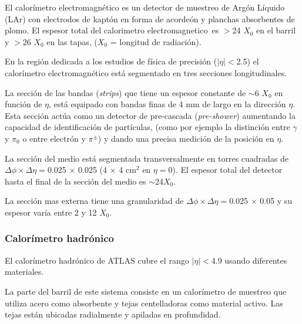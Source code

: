 El calorímetro electromagnético es un detector de muestreo de Argón Líquido (LAr)
con electrodos de kaptón en forma de acordeón y planchas absorbentes de plomo.
El espesor total del calorimetro electromagnetico\ es $>$24 $X_0$ en el barril
y $>$26 $X_0$ en las tapas, ($X_0$ = longitud de radiación).

En la región dedicada a los estudios de física de precisión ($|\eta|<$2.5) el
calorímetro electromagnético está segmentado en tres secciones longitudinales.%



La sección de las bandas (\emph{strips}) que tiene un espesor constante de $\sim$6 $X_0$ en función de $\eta$, está equipado con bandas finas de 4 mm de largo en la dirección $\eta$.
Esta sección actúa como un detector de pre-cascada (\emph{pre-shower}) aumentando la capacidad de identificación de partículas, (como por ejemplo la distinción entre $\gamma$ y $\pi_0$ o entre electrón y $\pi^\pm$) y dando una precisa medición de la posición en $\eta$.

La sección del medio está segmentada transversalmente en torres cuadradas de $\Delta \phi \times \Delta \eta=$0.025 $\times$ 0.025 (4 $\times$ 4 cm$^2$ en $\eta=0$).
El espesor total del detector hasta el final de la sección del medio es $\sim$24$X_0$.

La sección mas externa tiene una granularidad de $\Delta\phi\times\Delta\eta=$0.025 $\times$ 0.05 y su espesor varía entre 2 y 12 $X_0$.

\subsubsection{Calorímetro hadrónico}
El calorímetro hadrónico de ATLAS \cite{calohadTDR} cubre el rango $|\eta|<$4.9 usando diferentes materiales.

La parte del barril de este sistema consiste en un calorímetro de muestreo que utiliza
acero como absorbente y tejas centelladoras como material activo.
Las tejas están ubicadas radialmente y apiladas en profundidad.


